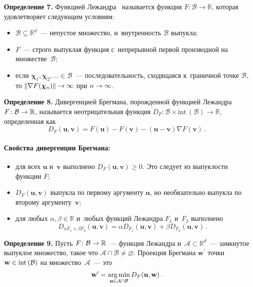 \begin{multicols}{2}
\smallskip

\noindent
\textbf{Определение 7.}
Функцией Лежандра~\cite{cesa2006prediction} называется функция $F
\colon \mathcal{B} \to \mathbb{R}$, которая удовлетворяет следующим условиям:
\begin{itemize}
    \item $\mathcal{B} \subseteq \mathbb{R}^d$~--- непустое множество, и~внутренность
    $\mathcal{B}$ выпукла;
    \item $F$~--- строго выпуклая функция с~непрерывной первой
    производной на множестве~$\mathcal{B}$;
    \item если $\boldsymbol{\chi}_1, \boldsymbol{\chi}_2, \ldots \in \mathcal{B}$~---
    последовательность, сходящаяся к~граничной точке $\mathcal{B}$, то $\| \nabla F(\boldsymbol{\chi}_n) \| \hm\rightarrow
    \infty$ при $n \hm\rightarrow \infty$.
\end{itemize}



\noindent
\textbf{Определение 8.} %
Дивергенцией Брегмана, порожденной функцией Лежандра $F \colon \mathcal{B}
\hm\to \mathbb{R}$, называется неотрицательная функция
$D_F \colon \mathcal{B} \times
\mathrm{int}\,(\mathcal{B}) \to \mathbb{R}$, определенная как
$$
    D_F(\mathbf{u}, \mathbf{v}) = F(\mathbf{u}) - F(\mathbf{v}) -
    (\mathbf{u} - \mathbf{v}) \nabla F(\mathbf{v})\,.
$$


\paragraph*{Свойства дивергенции Брегмана:}
\begin{itemize}
    \item для всех $\mathbf{u}$ и~$\mathbf{v}$ выполнено $D_F(\mathbf{u}, \mathbf{v}) \geq
    0$. Это следует из выпуклости функции $F$;
    \item $D_F(\mathbf{u}, \mathbf{v})$ выпукла по первому
    аргументу $\mathbf{u}$, но необязательно выпукла по второму
    аргументу~$\mathbf{v}$;
    \item для любых $\alpha, \beta \in \mathbb{R}$ и~любых функций
    Лежандра $F_1$ и~$F_2$ выполнено
    $$
    D_{\alpha F_1 + \beta F_2}(\mathbf{u}, \mathbf{v}) =
    \alpha D_{F_1}(\mathbf{u}, \mathbf{v}) + \beta D_{F_2}(\mathbf{u},
    \mathbf{v})\,.
    $$
\end{itemize}


\noindent
\textbf{Определение 9.} %
Пусть $F \colon \mathcal{B} \hm\to \mathbb{R}$~--- функция Лежандра и~$\mathcal{A} \subset
\mathbb{R}^d$~--- замкнутое выпуклое множество, такое что $\mathcal{A} \cap \mathcal{B} \neq
\varnothing$. Проекция Брегмана $\mathbf{w}^{\prime}$ точки
$\mathbf{w} \hm\in \mathrm{int}\,(\mathcal{B})$ на множество~$\mathcal{A}$~--- это
$$
    \mathbf{w}^{\prime} = \mathop{\mathrm{arg}\,\mathrm{min}}\limits_{\mathbf{u} \in \mathcal{A} \cap
    \mathcal{B}} D_F(\mathbf{u}, \mathbf{w})\,.
$$



\end{multicols}
